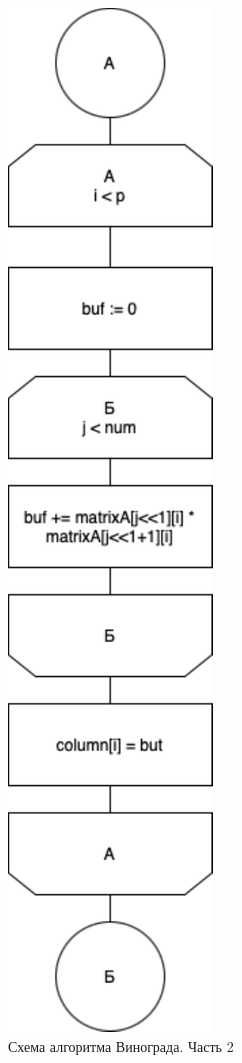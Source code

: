 \begin{figure}[h]
    \centering
    \includegraphics[width=0.28\linewidth]{img/WinogradOptB.pdf}
    \caption{Схема алгоритма Винограда. Часть 2}
    \label{fig:WinogradOptB}
\end{figure}

